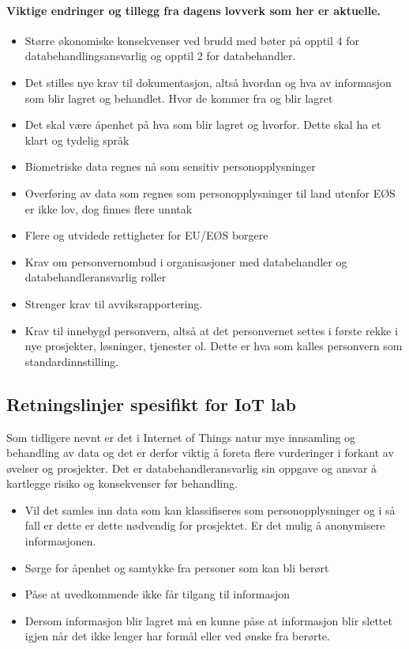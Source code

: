 \documentclass{article}
\begin{document}
\paragraph{Viktige endringer og tillegg fra dagens lovverk som her er aktuelle.}
\begin{itemize}
	\item Større økonomiske konsekvenser ved brudd med bøter på opptil 4 for databehandlingsansvarlig og opptil 2 for databehandler.
	\item Det stilles nye krav til dokumentasjon, altså hvordan og hva av informasjon som blir lagret og behandlet. Hvor de kommer fra og blir lagret
	\item Det skal være åpenhet på hva som blir lagret og hvorfor. Dette skal ha et klart og tydelig språk
	\item Biometriske data regnes nå som sensitiv personopplysninger
	\item Overføring av data som regnes som personopplysninger til land utenfor EØS er ikke lov, dog finnes flere unntak
	\item Flere og utvidede rettigheter for EU/EØS borgere
	\item Krav om personvernombud i organisasjoner med databehandler og databehandleransvarlig roller
	\item Strenger krav til avviksrapportering.
	\item Krav til innebygd personvern, altså at det personvernet settes i første rekke i nye prosjekter, løsninger, tjenester ol. Dette er hva som kalles personvern som standardinnstilling.
\end{itemize}

\subsection{Retningslinjer spesifikt for IoT lab}
Som tidligere nevnt er det i Internet of Things natur mye innsamling og behandling av data og det er derfor viktig å foreta flere vurderinger i forkant av øvelser og prosjekter. Det er databehandleransvarlig sin oppgave og ansvar å kartlegge risiko og konsekvenser før behandling.

\begin{itemize}
	\item Vil det samles inn data som kan klassifiseres som personopplysninger og i så fall er dette er dette nødvendig for prosjektet. Er det mulig å anonymisere informasjonen.
	\item Sørge for åpenhet og samtykke fra personer som kan bli berørt
	\item Påse at uvedkommende ikke får tilgang til informasjon
	\item Dersom informasjon blir lagret må en kunne påse at informasjon blir slettet igjen når det ikke lenger har formål eller ved ønske fra berørte. 
\end{itemize}
\end{document}
